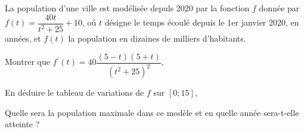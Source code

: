 \documentclass[11pt,a4paper]{article}  %
\begin{document}
La population d'une ville est modélisée depuls 2020 par la fonction $f$ donnée par $f(t)=\dfrac{40 t}{t^2+25}+10$, oú $t$ désigne le temps écoulé depuis le 1er janvier 2020, en années, et $f(t)$ la population en dizaines de milliers d'habitants.
\begin{enumMet}
	\item Montrer que $f^{\prime}(t)=40 \dfrac{(5-t)(5+t)}{\left(t^2+25\right)^2}$,
	\item En déduire le tableau de variations de $f$ sur $[0 ; 15]$,
	\item Quelle sera la population maximale dans ce modèle et en quelle année sera-t-elle atteinte ?
%	
\end{enumMet}
\end{document}
